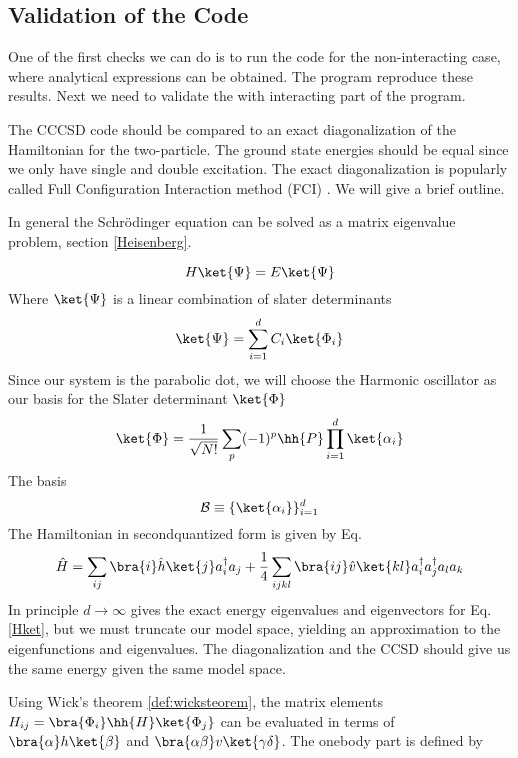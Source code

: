 \subsection{Validation of the Code}
One of the first checks we can do is to run the code for the non-interacting case, where analytical expressions can be obtained. The program reproduce these results. Next we need to validate the with interacting part of the program. 

The CCCSD code should be compared to an exact diagonalization of the Hamiltonian for the two-particle. The ground state energies should be equal since we only have single and double excitation. The exact diagonalization is popularly called Full Configuration Interaction method (FCI) \cite{Kvaal2008}. We will give a brief outline. 

In general the Schr\"{o}dinger equation can be solved as a matrix eigenvalue problem, section \ref{Heisenberg}. 

\begin{equation}
  H\ket{\Psi} = E \ket{\Psi}
  \label{Hket}
\end{equation}
%
Where $\ket{\Psi}$ is a linear combination of slater determinants 
%
\begin{equation}
\ket{\Psi} = \sum_{i=1}^{d} C_i \ket{\Phi_i}
  \label{d}
\end{equation}
%
Since our system is the parabolic dot, we will choose the Harmonic oscillator as our basis for the Slater determinant $\ket{\Phi}$
%
\begin{equation}
  \ket{\Phi} = \frac{1}{\sqrt{N!}} \sum_p (-1)^p \hh{P} \prod_{i=1}^d \ket{\alpha_i}
\end{equation}
%
The basis
\begin{equation}
  \mathcal{B} \equiv \{\ket{\alpha_i}\}_{i=1}^{d}
\end{equation}
%
The Hamiltonian in secondquantized form is given by Eq. 
%
\begin{equation}
\hat{H} = \sum_{ij} \bra{i}\hat{h}\ket{j}a_i^{\dagger} a_j+ \frac{1}{4} \sum_{ijkl} \bra{ij}\hat{v}\ket{kl} a_i^{\dagger} a_j^{\dagger} a_l a_k
\end{equation}
%
In principle $d \rightarrow \infty$ gives the exact energy eigenvalues and eigenvectors for Eq. \ref{Hket}, but we must truncate our model space, yielding an approximation to the eigenfunctions and eigenvalues. The diagonalization and the CCSD should give us the same energy given the same model space.

Using Wick's theorem \ref{def:wicksteorem}, the matrix elements $H_{ij} = \bra{\Phi_i}\hh{H}\ket{\Phi_j}$ can be evaluated in terms of $\bra{\alpha}h\ket{\beta}$ and $\bra{\alpha\beta}v\ket{\gamma \delta}$. The onebody part is defined by

